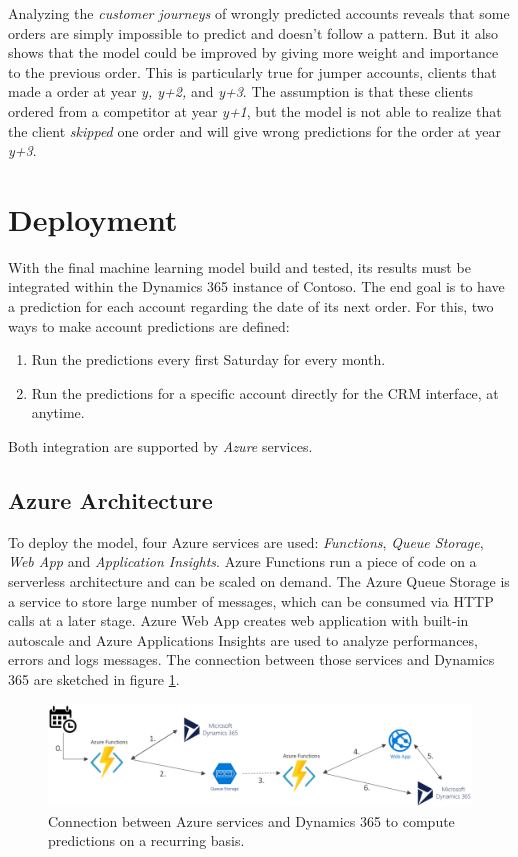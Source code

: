 Analyzing the \textit{customer journeys} of wrongly predicted accounts reveals that some orders are simply impossible to predict and doesn't follow a pattern. But it also shows that the model could be improved by giving more weight and importance to the previous order. This is particularly true for jumper accounts, clients that made a order at year \textit{y, y+2,} and \textit{y+3}. The assumption is that these clients ordered from a competitor at year \textit{y+1}, but the model is not able to realize that the client \textit{skipped} one order and will give wrong predictions for the order at year \textit{y+3}.

\section{Deployment} \label{sec:crm-deployment}
With the final machine learning model build and tested, its results must be integrated within the Dynamics 365 instance of Contoso. The end goal is to have a prediction for each account regarding the date of its next order. For this, two ways to make account predictions are defined:
\begin{enumerate}
    \item Run the predictions every first Saturday for every month.
    \item Run the predictions for a specific account directly for the CRM interface, at anytime.
\end{enumerate}

Both integration are supported by \textit{Azure} services.

\subsection{Azure Architecture}
To deploy the model, four Azure services are used: \textit{Functions}, \textit{Queue Storage}, \textit{Web App} and \textit{Application Insights}. Azure Functions run a piece of code on a serverless architecture and can be scaled on demand. The Azure Queue Storage is a service to store large number of messages, which can be consumed via HTTP calls at a later stage. Azure Web App creates web application with built-in autoscale and Azure Applications Insights are used to analyze performances, errors and logs messages. The connection between those services and Dynamics 365 are sketched in figure \ref{fig:azure-deployment}.

\begin{figure}[htbp]
    \centering
    \includegraphics[width=12cm]{images/azure-archi-weekly.png}
    \caption[Deployment's architecture for scheduled predictions]{Connection between Azure services and Dynamics 365 to compute predictions on a recurring basis.}
    \label{fig:azure-deployment}
\end{figure}

